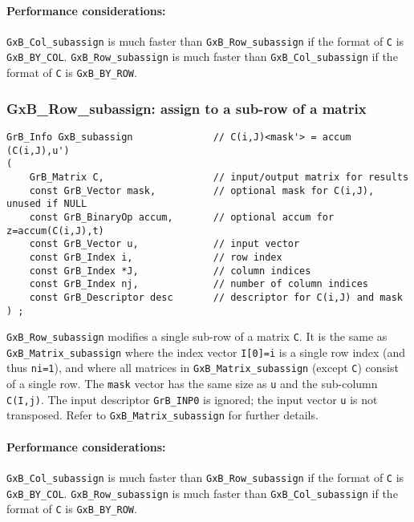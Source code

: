 \documentclass[12pt]{article}
\begin{document}
{\paragraph{\bf Performance considerations:} %
\verb'GxB_Col_subassign' is much faster than \verb'GxB_Row_subassign' if the
format of \verb'C' is \verb'GxB_BY_COL'.  \verb'GxB_Row_subassign' is much
faster than \verb'GxB_Col_subassign' if the format of \verb'C' is
\verb'GxB_BY_ROW'.

\subsubsection{{\sf GxB\_Row\_subassign:} assign to a sub-row of a matrix}
\label{subassign_row}

\begin{mdframed}[userdefinedwidth=6in]
{\footnotesize
\begin{verbatim}
GrB_Info GxB_subassign              // C(i,J)<mask'> = accum (C(i,J),u')
(
    GrB_Matrix C,                   // input/output matrix for results
    const GrB_Vector mask,          // optional mask for C(i,J), unused if NULL
    const GrB_BinaryOp accum,       // optional accum for z=accum(C(i,J),t)
    const GrB_Vector u,             // input vector
    const GrB_Index i,              // row index
    const GrB_Index *J,             // column indices
    const GrB_Index nj,             // number of column indices
    const GrB_Descriptor desc       // descriptor for C(i,J) and mask
) ;
\end{verbatim} } \end{mdframed}

\verb'GxB_Row_subassign' modifies a single sub-row of a matrix \verb'C'.  It is
the same as \verb'GxB_Matrix_subassign' where the index vector \verb'I[0]=i' is
a single row index (and thus \verb'ni=1'), and where all matrices in
\verb'GxB_Matrix_subassign' (except \verb'C') consist of a single row.  The
\verb'mask' vector has the same size as \verb'u' and the sub-column
\verb'C(I,j)'.  The input descriptor \verb'GrB_INP0' is ignored; the input
vector \verb'u' is not transposed.  Refer to \verb'GxB_Matrix_subassign' for
further details.

\paragraph{\bf Performance considerations:} %
\verb'GxB_Col_subassign' is much faster than \verb'GxB_Row_subassign' if the
format of \verb'C' is \verb'GxB_BY_COL'.  \verb'GxB_Row_subassign' is much
faster than \verb'GxB_Col_subassign' if the format of \verb'C' is
\verb'GxB_BY_ROW'.

}
\end{document}
